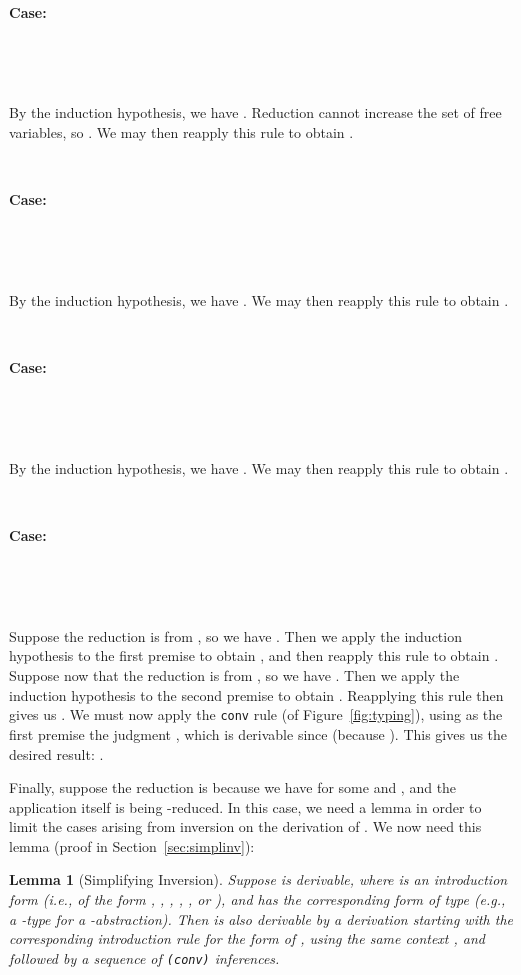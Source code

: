 \documentclass[copyright]{eptcs}
\newtheorem{lemma}{Lemma}
\begin{document}
\ 

\noindent \textbf{Case:}

\



\ 

\noindent By the induction hypothesis, we have .  Reduction cannot increase the set of free variables, so
.  We may then reapply this rule to obtain
.

\ 

\noindent \textbf{Case:}

\



\ 

\noindent By the induction hypothesis, we have .  We may then reapply this rule to obtain
.

\ 

\noindent \textbf{Case:}

\



\ 

\noindent By the induction hypothesis, we have .  We may then reapply this rule to obtain .

\ 

\noindent \textbf{Case:}

\



\ 

\noindent Suppose the reduction is from , so we have
.  Then we apply the induction hypothesis to
the first premise to obtain , and
then reapply this rule to obtain .
Suppose now that the reduction is from , so we have
.  Then we apply the induction hypothesis to
the second premise to obtain .  Reapplying this
rule then gives us .  We must now
apply the \texttt{conv} rule (of Figure~\ref{fig:typing}), using as
the first premise the judgment , which
is derivable since  (because ).  This gives
us the desired result: .

Finally, suppose the reduction is because we have  for some  and , and the application itself is being
-reduced.  In this case, we need a lemma in order to limit the
cases arising from inversion on the derivation of .  We now need this lemma (proof in
Section~\ref{sec:simplinv}):

\begin{lemma}[Simplifying Inversion]
\label{lem:simplinv}
Suppose  is derivable, where  is an
introduction form (i.e., of the form , , , ,
, or ), and  has the corresponding
form of type (e.g., a -type for a -abstraction).  Then
 is also derivable by a derivation starting with
the corresponding introduction rule for the form of , using the
same context , and followed by a sequence of \texttt{(conv)}
inferences.
\end{lemma}
\end{document}
